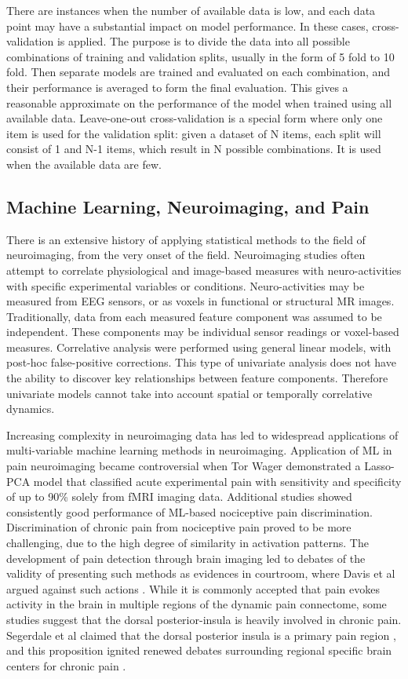 There are instances when the number of available data is low, and each data point may have a substantial impact on model performance. In these cases, cross-validation is applied. The purpose is to divide the data into all possible combinations of training and validation splits, usually in the form of 5 fold to 10 fold. Then separate models are trained and evaluated on each combination, and their performance is averaged to form the final evaluation. This gives a reasonable approximate on the performance of the model when trained using all available data. Leave-one-out cross-validation is a special form where only one item is used for the validation split: given a dataset of N items, each split will consist of 1 and N-1 items, which result in N possible combinations. It is used when the available data are few. 
 
\subsection{Machine Learning, Neuroimaging, and Pain}

There is an extensive history of applying statistical methods to the field of neuroimaging, from the very onset of the field. Neuroimaging studies often attempt to correlate physiological and image-based measures with neuro-activities with specific experimental variables or conditions. Neuro-activities may be measured from EEG sensors, or as voxels in functional or structural MR images. Traditionally, data from each measured feature component was assumed to be independent. These components may be individual sensor readings or voxel-based measures. Correlative analysis were performed using general linear models, with post-hoc false-positive corrections. This type of univariate analysis does not have the ability to discover key relationships between feature components. Therefore univariate models cannot take into account spatial or temporally correlative dynamics. 

Increasing complexity in neuroimaging data has led to widespread applications of multi-variable machine learning methods in neuroimaging. Application of ML in pain neuroimaging became controversial when Tor Wager \cite{Wager2013} demonstrated a Lasso-PCA model that classified acute experimental pain with sensitivity and specificity of up to 90\% solely from fMRI imaging data. Additional studies showed consistently good performance of ML-based nociceptive pain discrimination. Discrimination of chronic pain from nociceptive pain proved to be more challenging, due to the high degree of similarity in activation patterns. The development of pain detection through brain imaging led to debates of the validity of presenting such methods as evidences in courtroom, where Davis et al argued against such actions \cite{Davis2012a}. While it is commonly accepted that pain evokes activity in the brain in multiple regions of the dynamic pain connectome, some studies suggest that the dorsal posterior-insula is heavily involved in chronic pain. Segerdale et al claimed that the dorsal posterior insula is a primary pain region \cite{Segerdahl2015a}, and this proposition ignited renewed debates surrounding regional specific brain centers for chronic pain \cite{Davis2015}.

